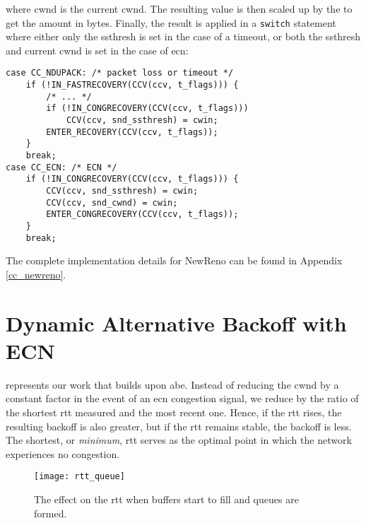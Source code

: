 where cwnd is the current \gls{cwnd}. The resulting value is then scaled up by the  to get the amount in bytes. Finally, the result is applied in a \lstinline{switch} statement where either only the \gls{ssthresh} is set in the case of a timeout, or both the \gls{ssthresh} and current \gls{cwnd} is set in the case of \gls{ecn}:

\begin{verbatim}
case CC_NDUPACK: /* packet loss or timeout */
    if (!IN_FASTRECOVERY(CCV(ccv, t_flags))) {
        /* ... */
        if (!IN_CONGRECOVERY(CCV(ccv, t_flags)))
            CCV(ccv, snd_ssthresh) = cwin;
        ENTER_RECOVERY(CCV(ccv, t_flags));
    }
    break;
case CC_ECN: /* ECN */
    if (!IN_CONGRECOVERY(CCV(ccv, t_flags))) {
        CCV(ccv, snd_ssthresh) = cwin;
        CCV(ccv, snd_cwnd) = cwin;
        ENTER_CONGRECOVERY(CCV(ccv, t_flags));
    }
    break;
\end{verbatim}
The complete implementation details for NewReno can be found in Appendix \ref{cc_newreno}.









\section{Dynamic Alternative Backoff with ECN}

 represents our work that builds upon \gls{abe}. Instead of reducing the \gls{cwnd} by a constant factor in the event of an \gls{ecn} congestion signal, we reduce by the ratio of the shortest \gls{rtt} measured and the most recent one. Hence, if the \gls{rtt} rises, the resulting backoff is also greater, but if the \gls{rtt} remains stable, the backoff is less. The shortest, or \textit{minimum}, \gls{rtt} serves as the optimal point in which the network experiences no congestion.

\begin{figure}[H]
    \centering
    \texttt{[image: rtt\_queue]}
    \captionsetup{width=0.6\linewidth}
    \caption{The effect on the \gls{rtt} when buffers start to fill and queues are formed. }
    \label{fig:rtt_queue}
\end{figure}


